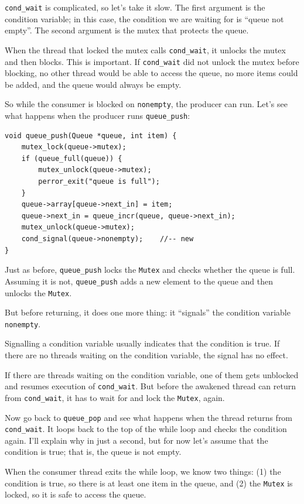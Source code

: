\documentclass[12pt]{book}
\begin{document}
{\verb"cond_wait" is complicated, so let's take it slow.  
The first argument is the condition variable; in this case,
the condition we are waiting for is ``queue not empty''.  The second
argument is the mutex that protects the queue.

When the thread that locked the mutex calls \verb"cond_wait", it
unlocks the mutex and then blocks.  This is important.  If
\verb"cond_wait" did not unlock the mutex before blocking, no
other thread would be able to access the queue, no more items
could be added, and the queue would always be empty.

So while the consumer is blocked on {\tt nonempty}, the producer can
run.  Let's see what happens when the producer runs \verb"queue_push":

\begin{verbatim}
void queue_push(Queue *queue, int item) {
    mutex_lock(queue->mutex);
    if (queue_full(queue)) {
        mutex_unlock(queue->mutex);
        perror_exit("queue is full");
    }
    queue->array[queue->next_in] = item;
    queue->next_in = queue_incr(queue, queue->next_in);
    mutex_unlock(queue->mutex);
    cond_signal(queue->nonempty);    //-- new
}
\end{verbatim}

Just as before, \verb"queue_push" locks the {\tt Mutex} and checks
whether the queue is full.  Assuming it is not, \verb"queue_push" adds
a new element to the queue and then unlocks the {\tt Mutex}.

But before returning, it does one more thing: it ``signals'' the
condition variable {\tt nonempty}.

Signalling a condition variable usually indicates that the condition is
true.  If there are no threads waiting
on the condition variable, the signal has no effect.

If there are threads waiting on the condition variable, one of them
gets unblocked and resumes execution of \verb"cond_wait".  But before
the awakened thread can return from \verb"cond_wait", it has
to wait for and lock the {\tt Mutex}, again.

Now go back to \verb"queue_pop" and see what happens when the thread
returns from \verb"cond_wait".  It loops back to the top of the while
loop and checks the condition again.  I'll explain why in just a
second, but for now let's assume that the condition is true; that is,
the queue is not empty.

When the consumer thread exits the while loop, we know two things: (1)
the condition is true, so there is at least one item in the queue, and
(2) the {\tt Mutex} is locked, so it is safe to access the queue.

}
\end{document}
